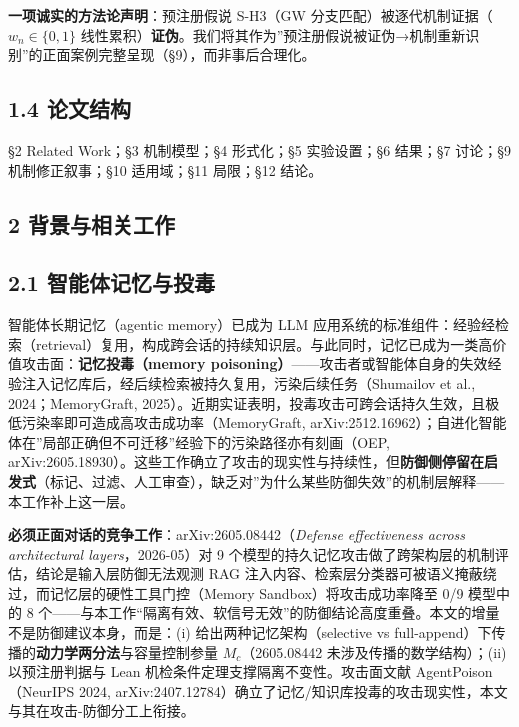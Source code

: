 \documentclass[
]{ctexart}
\begin{document}
\textbf{一项诚实的方法论声明}：预注册假说 S-H3（GW
分支匹配）被逐代机制证据（\(w_n\in\{0,1\}\)
线性累积）\textbf{证伪}。我们将其作为''预注册假说被证伪→机制重新识别''的正面案例完整呈现（§9），而非事后合理化。

\subsection{1.4 论文结构}\label{ux8bbaux6587ux7ed3ux6784}

§2 Related Work；§3 机制模型；§4 形式化；§5 实验设置；§6 结果；§7
讨论；§9 机制修正叙事；§10 适用域；§11 局限；§12 结论。

\subsection{2
背景与相关工作}\label{ux80ccux666fux4e0eux76f8ux5173ux5de5ux4f5c}

\subsection{2.1
智能体记忆与投毒}\label{ux667aux80fdux4f53ux8bb0ux5fc6ux4e0eux6295ux6bd2}

智能体长期记忆（agentic memory）已成为 LLM
应用系统的标准组件：经验经检索（retrieval）复用，构成跨会话的持续知识层。与此同时，记忆已成为一类高价值攻击面：\textbf{记忆投毒（memory
poisoning）}------攻击者或智能体自身的失效经验注入记忆库后，经后续检索被持久复用，污染后续任务（Shumailov
et al., 2024；MemoryGraft,
2025）。近期实证表明，投毒攻击可跨会话持久生效，且极低污染率即可造成高攻击成功率（MemoryGraft,
arXiv:2512.16962）；自进化智能体在''局部正确但不可迁移''经验下的污染路径亦有刻画（OEP,
arXiv:2605.18930）。这些工作确立了攻击的现实性与持续性，但\textbf{防御侧停留在启发式}（标记、过滤、人工审查），缺乏对''为什么某些防御失效''的机制层解释------本工作补上这一层。

\textbf{必须正面对话的竞争工作}：arXiv:2605.08442（\emph{Defense
effectiveness across architectural layers}，2026-05）对 9
个模型的持久记忆攻击做了跨架构层的机制评估，结论是输入层防御无法观测 RAG
注入内容、检索层分类器可被语义掩蔽绕过，而记忆层的硬性工具门控（Memory
Sandbox）将攻击成功率降至 0/9 模型中的 8
个------与本工作``隔离有效、软信号无效''的防御结论高度重叠。本文的增量不是防御建议本身，而是：(i)
给出两种记忆架构（selective vs
full-append）下传播的\textbf{动力学两分法}与容量控制参量
\(M_c\)（2605.08442 未涉及传播的数学结构）；(ii) 以预注册判据与 Lean
机检条件定理支撑隔离不变性。攻击面文献 AgentPoison（NeurIPS 2024,
arXiv:2407.12784）确立了记忆/知识库投毒的攻击现实性，本文与其在攻击-防御分工上衔接。
\end{document}
